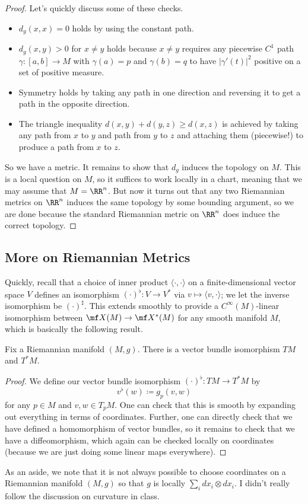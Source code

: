 \documentclass[../notes.tex]{subfiles}
\begin{document}
\begin{proof}
	Let's quickly discuss some of these checks.
	\begin{itemize}
		\item $d_g(x,x)=0$ holds by using the constant path.
		\item $d_g(x,y)>0$ for $x\ne y$ holds because $x\ne y$ requires any piecewise $C^1$ path $\gamma\colon[a,b]\to M$ with $\gamma(a)=p$ and $\gamma(b)=q$ to have $\left|\gamma'(t)\right|^2$ positive on a set of positive measure.
		\item Symmetry holds by taking any path in one direction and reversing it to get a path in the opposite direction.
		\item The triangle inequality $d(x,y)+d(y,z)\ge d(x,z)$ is achieved by taking any path from $x$ to $y$ and path from $y$ to $z$ and attaching them (piecewise!) to produce a path from $x$ to $z$.
	\end{itemize}
	So we have a metric. It remains to show that $d_g$ induces the topology on $M$. This is a local question on $M$, so it suffices to work locally in a chart, meaning that we may assume that $M=\RR^n$. But now it turns out that any two Riemannian metrics on $\RR^n$ induces the same topology by some bounding argument, so we are done because the standard Riemannian metric on $\RR^n$ does induce the correct topology.
\end{proof}

\subsection{More on Riemannian Metrics}
Quickly, recall that a choice of inner product $\langle\cdot,\cdot\rangle$ on a finite-dimensional vector space $V$ defines an isomorphism $(\cdot)^\flat\colon V\to V^*$ via $v\mapsto\langle v,\cdot\rangle$; we let the inverse isomorphism be $(\cdot)^\sharp$. This extends smoothly to provide a $C^\infty(M)$-linear isomorphism between $\mf X(M)\to\mf X^*(M)$ for any smooth manifold $M$, which is basically the following result.
\begin{proposition}
	Fix a Riemannian manifold $(M,g)$. There is a vector bundle isomorphism $TM$ and $T^*M$.
\end{proposition}
\begin{proof}
	We define our vector bundle isomorphism $(\cdot)^\flat\colon TM\to T^*M$ by
	\[v^\flat(w)\coloneqq g_p(v,w)\]
	for any $p\in M$ and $v,w\in T_pM$. One can check that this is smooth by expanding out everything in terms of coordinates. Further, one can directly check that we have defined a homomorphism of vector bundles, so it remains to check that we have a diffeomorphism, which again can be checked locally on coordinates (because we are just doing some linear maps everywhere).
\end{proof}
As an aside, we note that it is not always possible to choose coordinates on a Riemannian manifold $(M,g)$ so that $g$ is locally $\sum_idx_i\otimes dx_i$. I didn't really follow the discussion on curvature in class.
\end{document}
